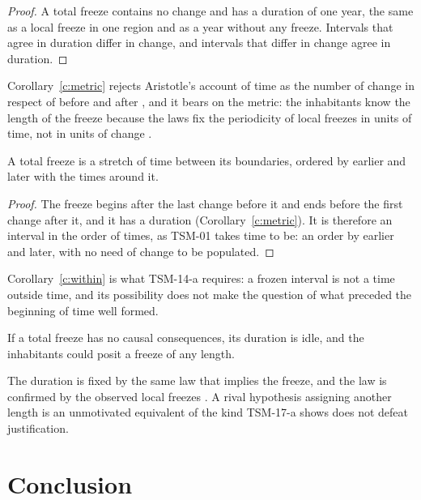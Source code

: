 \documentclass{situationist-preprint}
\begin{document}
\begin{proof}
A total freeze contains no change and has a duration of one year, the same as a local freeze in one region and as a year without any freeze. Intervals that agree in duration differ in change, and intervals that differ in change agree in duration.
\end{proof}

Corollary~\ref{c:metric} rejects Aristotle's account of time as the number of change in respect of before and after \citep[IV.11]{Aristotle}, and it bears on the metric: the inhabitants know the length of the freeze because the laws fix the periodicity of local freezes in units of time, not in units of change \citep{NewtonSmith1980}.

\begin{corollary}\label{c:within}
A total freeze is a stretch of time between its boundaries, ordered by earlier and later with the times around it.
\end{corollary}

\begin{proof}
The freeze begins after the last change before it and ends before the first change after it, and it has a duration (Corollary~\ref{c:metric}). It is therefore an interval in the order of times, as TSM-01 takes time to be: an order by earlier and later, with no need of change to be populated.
\end{proof}

Corollary~\ref{c:within} is what TSM-14-a requires: a frozen interval is not a time outside time, and its possibility does not make the question of what preceded the beginning of time well formed.

\begin{objection}
If a total freeze has no causal consequences, its duration is idle, and the inhabitants could posit a freeze of any length.
\end{objection}

\begin{reply}
The duration is fixed by the same law that implies the freeze, and the law is confirmed by the observed local freezes \citep{Warmbrod2004}. A rival hypothesis assigning another length is an unmotivated equivalent of the kind TSM-17-a shows does not defeat justification.
\end{reply}

\section{Conclusion}
\end{document}
